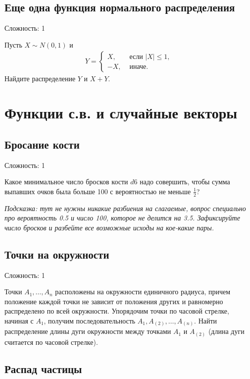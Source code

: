 \documentclass[12pt]{article}
\begin{document}
\subsection{Еще одна функция нормального распределения}

Сложность: 1

Пусть $X \sim N(0, 1)$ и 
\begin{align*}
    Y = \begin{cases}
        X, &\text{ если } |X| \le 1, \\
        -X, &\text{ иначе.}
    \end{cases}
\end{align*}
Найдите распределение $Y$ и $X + Y$.

\section{Функции с.в. и случайные векторы}

\subsection{Бросание кости}

Сложность: 1

Какое минимальное число бросков кости $d6$ надо совершить, чтобы сумма выпавших очков была больше 100 с вероятностью не меньше $\frac{1}{2}$? 

\emph{Подсказка: тут не нужны никакие разбиения на слагаемые, вопрос специально про вероятность 0.5 и число 100, которое не делится на 3.5. Зафиксируйте число бросков и разбейте все возможные исходы на кое-какие пары.}

\subsection{Точки на окружности}

Сложность: 1

Точки $A_1, \dots, A_n$ расположены на окружности единичного радиуса, причем положение каждой точки не зависит от положения других и равномерно распределено по всей окружности. Упорядочим точки по часовой стрелке, начиная с $A_1$, получим последовательность $A_1, A_{(2)}, \dots, A_{(n)}$. Найти распределение длины дуги окружности между точками $A_1$ и $A_{(2)}$ (длина дуги считается по часовой стрелке).

\subsection{Распад частицы}
\end{document}
